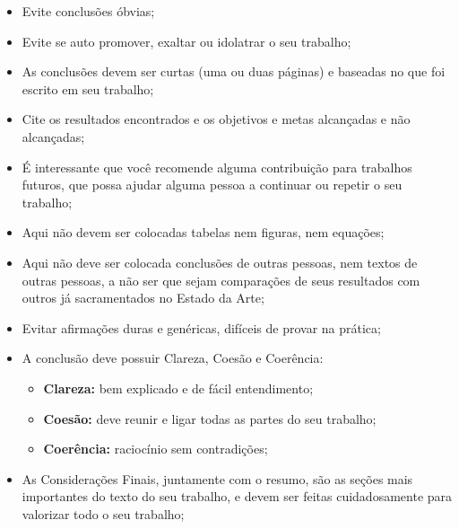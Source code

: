 \begin{itemize}
    \item Evite conclusões óbvias;
    \item Evite se auto promover, exaltar ou idolatrar o seu trabalho;
    \item As conclusões devem ser curtas (uma ou duas páginas) e baseadas no que foi escrito em seu trabalho;
    \item Cite os resultados encontrados e os objetivos e metas alcançadas e não alcançadas;
    \item É interessante que você recomende alguma contribuição para trabalhos futuros, que possa ajudar alguma pessoa a continuar ou repetir o seu trabalho;
    \item Aqui não devem ser colocadas tabelas nem figuras, nem equações;
    \item Aqui não deve ser colocada conclusões de outras pessoas, nem textos de outras pessoas, a não ser que sejam comparações de seus resultados com outros já sacramentados no Estado da Arte;
    \item Evitar afirmações duras e genéricas, difíceis de provar na prática;
    \item A conclusão deve possuir Clareza, Coesão e Coerência:
    \begin{itemize}
        \item {\bf Clareza:} bem explicado e de fácil entendimento;
        \item {\bf Coesão:} deve reunir e ligar todas as partes do seu trabalho;
        \item {\bf Coerência:} raciocínio sem contradições;
    \end{itemize}
    \item As Considerações Finais, juntamente com o resumo, são as seções mais importantes do texto do seu trabalho, e devem ser feitas cuidadosamente para valorizar todo o seu trabalho; 
\end{itemize}